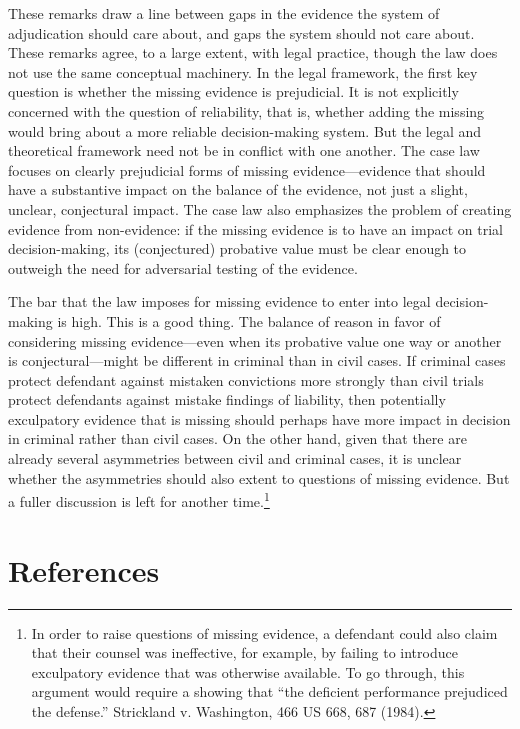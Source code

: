 \documentclass[
  10pt,
  dvipsnames,enabledeprecatedfontcommands]{scrartcl}
\begin{document}
These remarks draw a line between gaps in the evidence the system of
adjudication should care about, and gaps the system should not care
about. These remarks agree, to a large extent, with legal practice,
though the law does not use the same conceptual machinery. In the legal
framework, the first key question is whether the missing evidence is
prejudicial. It is not explicitly concerned with the question of
reliability, that is, whether adding the missing would bring about a
more reliable decision-making system. But the legal and theoretical
framework need not be in conflict with one another. The case law focuses
on clearly prejudicial forms of missing evidence---evidence that should
have a substantive impact on the balance of the evidence, not just a
slight, unclear, conjectural impact. The case law also emphasizes the
problem of creating evidence from non-evidence: if the missing evidence
is to have an impact on trial decision-making, its (conjectured)
probative value must be clear enough to outweigh the need for
adversarial testing of the evidence.

The bar that the law imposes for missing evidence to enter into legal
decision-making is high. This is a good thing. The balance of reason in
favor of considering missing evidence---even when its probative value
one way or another is conjectural---might be different in criminal than
in civil cases. If criminal cases protect defendant against mistaken
convictions more strongly than civil trials protect defendants against
mistake findings of liability, then potentially exculpatory evidence
that is missing should perhaps have more impact in decision in criminal
rather than civil cases. On the other hand, given that there are already
several asymmetries between civil and criminal cases, it is unclear
whether the asymmetries should also extent to questions of missing
evidence. But a fuller discussion is left for another time.\footnote{In
  order to raise questions of missing evidence, a defendant could also
  claim that their counsel was ineffective, for example, by failing to
  introduce exculpatory evidence that was otherwise available. To go
  through, this argument would require a showing that ``the deficient
  performance prejudiced the defense.'' Strickland v. Washington, 466 US
  668, 687 (1984).}

\hypertarget{references}{%
\section*{References}\label{references}}
\end{document}

